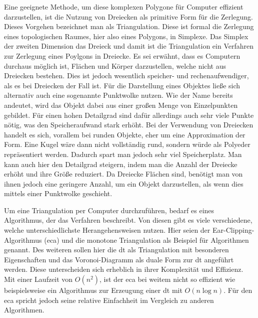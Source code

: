 Eine geeignete Methode, um diese komplexen Polygone für Computer effizient darzustellen, ist die Nutzung von Dreiecken als primitive Form für die Zerlegung.
Dieses Vorgehen bezeichnet man als Triangulation. Diese ist formal die Zerlegung eines topologischen Raumes, hier also eines Polygons, in Simplexe. Das Simplex der zweiten Dimension das Dreieck und damit ist die Triangulation
ein Verfahren zur Zerlegung eines Poylgons in Dreiecke.
Es sei erwähnt, dass es Computern durchaus möglich ist, Flächen und Körper darzustellen, welche nicht aus Dreiecken bestehen. Dies ist jedoch wesentlich speicher- und rechenaufwendiger, als es bei
Dreiecken der Fall ist. Für die Darstellung eines Objektes ließe sich alternativ auch eine sogenannte Punktwolke nutzen. Wie der Name bereits andeutet, wird das Objekt dabei aus einer großen Menge
von Einzelpunkten gebildet. Für einen hohen Detailgrad sind dafür allerdings auch sehr viele Punkte nötig, was den Speicheraufwand stark erhöht. Bei der Verwendung von Dreiecken handelt es sich, vorallem
bei runden Objekte, eher um eine Approximation der Form. Eine Kugel wäre dann nicht vollständig rund, sondern würde als Polyeder repräsentiert werden. Dadurch spart man jedoch sehr viel Speicherplatz.
Man kann auch hier den Detailgrad steigern, indem man die Anzahl der Dreiecke erhöht und ihre Größe reduziert. Da Dreiecke Flächen sind, benötigt man von ihnen jedoch eine geringere Anzahl, um ein Objekt darzustellen, als wenn dies mittels einer Punktwolke geschieht.

Um eine Triangulation per Computer durchzuführen, bedarf es eines Algorithmus, der das Verfahren beschreibt. Von diesen gibt es viele verschiedene, welche unterschiedlichste Herangehensweisen nutzen.
Hier seien der Ear-Clipping-Algorithmus (\ac{eca}) und die monotone Triangulation als Beispiel für Algorithmen genannt. Des weiteren sollen hier die \ac{dt} als Triangulation mit besonderen Eigenschaften und das Voronoi-Diagramm als duale Form zur \ac{dt} angeführt werden. 
Diese unterscheiden sich erheblich in ihrer Komplexität und Effizienz. 
Mit einer Laufzeit von $O(n^2)$\cite{earclipping2}, ist der \ac{eca} bei weitem nicht so effizient wie beispielsweise ein Algorithmus zur Erzeugung einer \ac{dt} mit $O(n\log n)$. Für den \ac{eca} spricht jedoch seine relative Einfachheit im Vergleich zu anderen Algorithmen.\linebreak 

